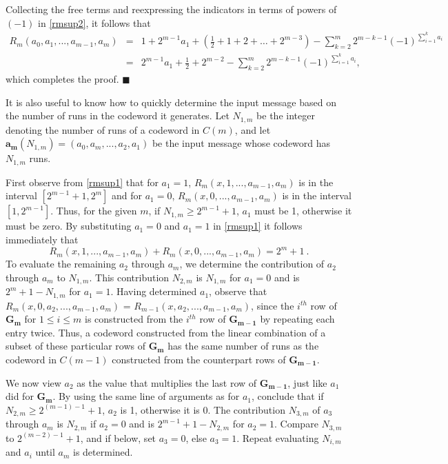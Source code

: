 \documentclass[12pt]{article} \pagestyle{plain} \topmargin
\begin{document}
Collecting the free terms and reexpressing the indicators in terms
of powers of $(-1)$ in \eqref{rmsup2}, it follows that
\begin{equation}\label{rmsup3}\begin{array}{lll}
R_m(a_0,a_1,...,a_{m-1},a_m)&=&1+2^{m-1}a_1+(\frac{1}{2}+1+2+\dots+2^{m-3})-\sum_{k=2}^m
2^{m-k-1}(-1)^{\sum_{i=1}^k a_i}\\
{}&=&2^{m-1}a_1+ \frac{1}{2}+2^{m-2}-\sum_{k=2}^m
2^{m-k-1}(-1)^{\sum_{i=1}^k a_i},
\end{array}\end{equation}
which completes the proof.
 \hfill
$\blacksquare$

It is also useful to know how to quickly determine the input message
based on the number of runs in the codeword it generates. Let
$N_{1,m}$ be the integer denoting the number of runs of a codeword
in $C(m)$, and let $\mathbf{a_m}(N_{1,m})=(a_0,a_m,...,a_{2},a_1)$
be the input message whose codeword has $N_{1,m}$ runs.%

First observe from \eqref{rmsup1} that for $a_1=1$,
$R_m(x,1,...,a_{m-1},a_m)$ is in the interval $[2^{m-1}+1, 2^m]$ and
for $a_1=0$, $R_m(x,0,...,a_{m-1},a_m)$ is in the interval
$[1,2^{m-1}]$. Thus, for the given $m$, if $N_{1,m} \geq 2^{m-1}+1$,
$a_1$ must be 1, otherwise it must be zero. By substituting $a_1=0$
and $a_1=1$ in \eqref{rmsup1} it follows immediately that
\[R_m(x,1,...,a_{m-1},a_m) + R_m(x,0,...,a_{m-1},a_m)=2^m+1~.\]
To evaluate the remaining $a_2$ through $a_m$, we determine the
contribution of $a_2$ through $a_m$ to $N_{1,m}$. This contribution
$N_{2,m}$ is $N_{1,m}$ for $a_1=0$ and is $2^{m}+1-N_{1,m}$ for
$a_1=1$. Having determined $a_1$, observe that
$R_m(x,0,a_2,...,a_{m-1},a_m)$ = $R_{m-1}(x,a_2,...,a_{m-1},a_m)$,
since the $i^{th}$ row of $\mathbf{G_m}$ for $1 \leq i \leq m$ is
constructed from the $i^{th}$ row of $\mathbf{G_{m-1}}$ by repeating
each entry twice. Thus, a codeword constructed from the linear
combination of a subset of these particular rows of $\mathbf{G_m}$
has the same number of runs as the codeword in $C(m-1)$ constructed
from the counterpart rows of $\mathbf{G_{m-1}}$.

We now view $a_2$ as the value that multiplies the last row of
$\mathbf{G_{m-1}}$, just like $a_1$ did for $\mathbf{G_{m}}$. By
using the same line of arguments as for $a_1$, conclude that if
$N_{2,m} \geq 2^{(m-1)-1}+1$, $a_2$ is 1, otherwise it is 0. The
contribution $N_{3,m}$ of $a_3$ through $a_m$ is $N_{2,m}$ if
$a_2=0$ and is $2^{m-1}+1-N_{2,m}$ for $a_2=1$. Compare $N_{3,m}$ to
$2^{(m-2)-1}+1$, and if below, set $a_3=0$, else $a_3=1$. Repeat
evaluating $N_{i,m}$ and $a_i$ until $a_m$ is determined.
\end{document}
